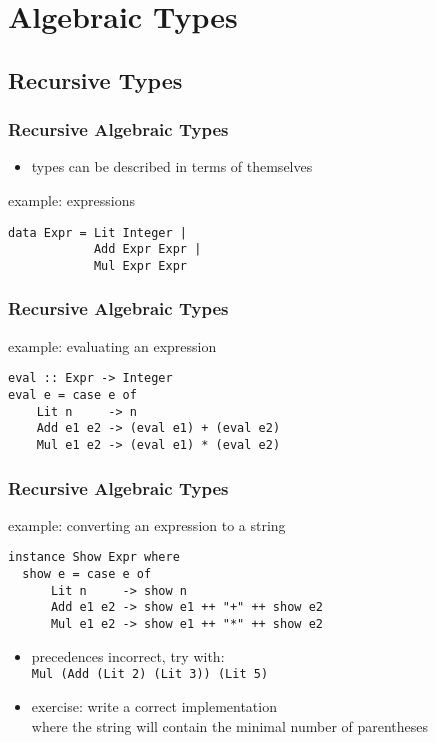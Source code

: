 \documentclass[dvipsnames]{beamer}
\theoremstyle{plain}
\begin{document}
\section{Algebraic Types}

\subsection{Recursive Types}

\begin{frame}[fragile]
  \frametitle{Recursive Algebraic Types}

  \begin{itemize}
    \item types can be described in terms of themselves
  \end{itemize}

  \begin{exampleblock}{example: expressions}
    \begin{lstlisting}
data Expr = Lit Integer |
            Add Expr Expr |
            Mul Expr Expr
    \end{lstlisting}
  \end{exampleblock}
\end{frame}

\begin{frame}[fragile]
  \frametitle{Recursive Algebraic Types}

  \begin{exampleblock}{example: evaluating an expression}
    \begin{lstlisting}
eval :: Expr -> Integer
eval e = case e of
    Lit n     -> n
    Add e1 e2 -> (eval e1) + (eval e2)
    Mul e1 e2 -> (eval e1) * (eval e2)
    \end{lstlisting}
  \end{exampleblock}
\end{frame}

\begin{frame}[fragile]
  \frametitle{Recursive Algebraic Types}

  \begin{exampleblock}{example: converting an expression to a string}
    \begin{lstlisting}
instance Show Expr where
  show e = case e of
      Lit n     -> show n
      Add e1 e2 -> show e1 ++ "+" ++ show e2
      Mul e1 e2 -> show e1 ++ "*" ++ show e2
    \end{lstlisting}
  \end{exampleblock}

  \pause
  \begin{itemize}
    \item precedences incorrect, try with:\\
      \lstinline|Mul (Add (Lit 2) (Lit 3)) (Lit 5)|
    \item exercise: write a correct implementation\\
      where the string will contain the minimal number of parentheses
  \end{itemize}
\end{frame}
\end{document}
